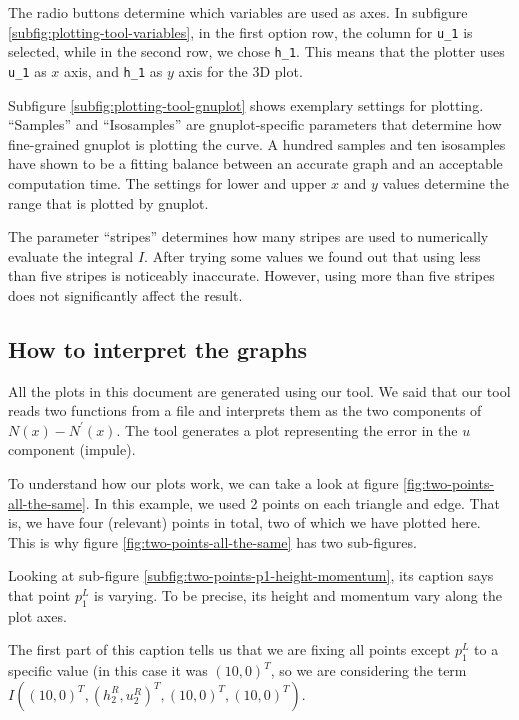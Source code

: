 \documentclass{article}
\begin{document}
The radio buttons determine which variables are used as axes. In subfigure \ref{subfig:plotting-tool-variables}, in the first option row, the column for \texttt{u\_1} is selected, while in the second row, we chose \texttt{h\_1}. This means that the plotter uses \texttt{u\_1} as $x$ axis, and \texttt{h\_1} as $y$ axis for the 3D plot.

Subfigure \ref{subfig:plotting-tool-gnuplot} shows exemplary settings for plotting. ``Samples'' and ``Isosamples'' are gnuplot-specific parameters that determine how fine-grained gnuplot is plotting the curve. A hundred samples and ten isosamples have shown to be a fitting balance between an accurate graph and an acceptable computation time. The settings for lower and upper $x$ and $y$ values determine the range that is plotted by gnuplot.

The parameter ``stripes'' determines how many stripes are used to numerically evaluate the integral $I$. After trying some values we found out that using less than five stripes is noticeably inaccurate. However, using more than five stripes does not significantly affect the result.

\subsection{How to interpret the graphs}
\label{sec:how-to-interpret-graphs}

All the plots in this document are generated using our tool. We said that our tool reads two functions from a file and interprets them as the two components of $N\left(x\right)-N^\prime\left(x\right)$. The tool generates a plot representing the error in the $u$ component (impule).

To understand how our plots work, we can take a look at figure \ref{fig:two-points-all-the-same}. In this example, we used 2 points on each triangle and edge. That is, we have four (relevant) points in total, two of which we have plotted here. This is why figure \ref{fig:two-points-all-the-same} has two sub-figures.

Looking at sub-figure \ref{subfig:two-points-p1-height-momentum}, its caption says that point $p_1^L$ is varying. To be precise, its height and momentum vary along the plot axes.

The first part of this caption tells us that we are fixing all points except $p_1^L$ to a specific value (in this case it was $\left(10, 0\right)^T$, so we are considering the term $I\left(\left(10, 0\right)^T, \left(h_2^R, u_2^R\right)^T, \left(10, 0\right)^T, \left(10, 0\right)^T\right)$.
\end{document}
